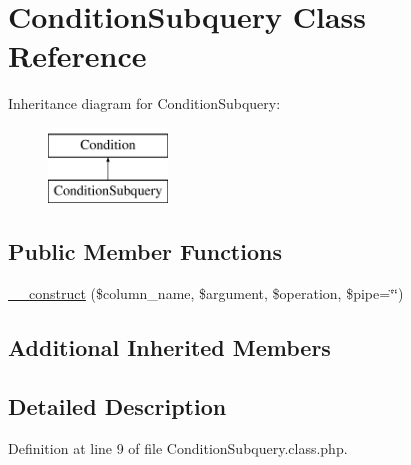 \hypertarget{classConditionSubquery}{\section{Condition\-Subquery Class Reference}
\label{classConditionSubquery}
}
Inheritance diagram for Condition\-Subquery\-:\begin{figure}[H]
\begin{center}
\leavevmode
\includegraphics[height=2.000000cm]{classConditionSubquery}
\end{center}
\end{figure}
\subsection*{Public Member Functions}
\begin{DoxyCompactItemize}
\item 
\hyperlink{classConditionSubquery_a0f84f26ceae823c0bf232c909fe43c50}{\-\_\-\-\_\-construct} (\$column\-\_\-name, \$argument, \$operation, \$pipe=\char`\"{}\char`\"{})
\end{DoxyCompactItemize}
\subsection*{Additional Inherited Members}


\subsection{Detailed Description}


Definition at line 9 of file Condition\-Subquery.\-class.\-php.



